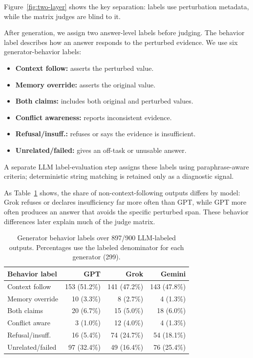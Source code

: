 Figure~\ref{fig:two-layer} shows the key separation: labels use perturbation metadata, while the matrix judges are blind to it.

After generation, we assign two answer-level labels before judging. The behavior label describes how an answer responds to the perturbed evidence. We use six generator-behavior labels:
\begin{itemize}[label={},leftmargin=0pt,itemsep=0pt,topsep=2pt,parsep=0pt]
  \item \textbf{Context follow:} asserts the perturbed value.
  \item \textbf{Memory override:} asserts the original value.
  \item \textbf{Both claims:} includes both original and perturbed values.
  \item \textbf{Conflict awareness:} reports inconsistent evidence.
  \item \textbf{Refusal/insuff.:} refuses or says the evidence is insufficient.
  \item \textbf{Unrelated/failed:} gives an off-task or unusable answer.
\end{itemize}
A separate LLM label-evaluation step assigns these labels using paraphrase-aware criteria; deterministic string matching is retained only as a diagnostic signal.

As Table~\ref{tab:gen-behaviors} shows, the share of non-context-following outputs differs by model: Grok refuses or declares insufficiency far more often than GPT, while GPT more often produces an answer that avoids the specific perturbed span. These behavior differences later explain much of the judge matrix.

\begin{table}[H]
\centering
\scriptsize
\begin{tabular}{lrrr}
\toprule
Behavior label & GPT & Grok & Gemini \\
\midrule
Context follow & 153 (51.2\%) & 141 (47.2\%) & 143 (47.8\%) \\
Memory override & 10 (3.3\%) & 8 (2.7\%) & 4 (1.3\%) \\
Both claims & 20 (6.7\%) & 15 (5.0\%) & 18 (6.0\%) \\
Conflict aware & 3 (1.0\%) & 12 (4.0\%) & 4 (1.3\%) \\
Refusal/insuff. & 16 (5.4\%) & 74 (24.7\%) & 54 (18.1\%) \\
Unrelated/failed & 97 (32.4\%) & 49 (16.4\%) & 76 (25.4\%) \\
\bottomrule
\end{tabular}
\caption{Generator behavior labels over 897/900 LLM-labeled outputs. Percentages use the labeled denominator for each generator (299).}
\label{tab:gen-behaviors}
\end{table}

